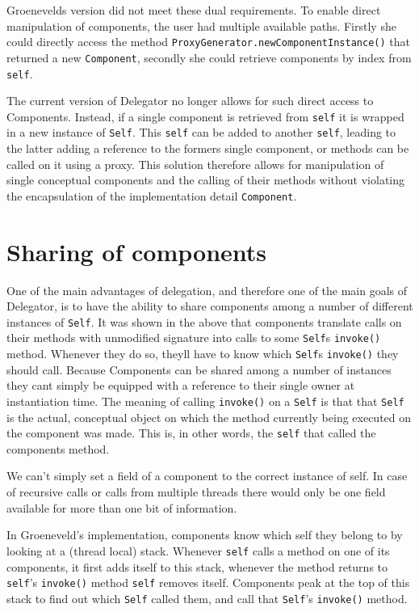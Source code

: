 \documentclass[a4paper,12pt]{book}
\begin{document}
Groenevelds version did not meet these dual requirements. To enable direct manipulation of components, the user had multiple available paths. Firstly she could directly access the method \verb|ProxyGenerator.newComponentInstance()| that returned a new \verb|Component|, secondly she could retrieve components by index from \verb|self|.

The current version of Delegator no longer allows for such direct access to Components. Instead, if a single component is retrieved from \verb|self| it is wrapped in a new instance of \verb|Self|. This \verb|self| can be added to another \verb|self|, leading to the latter adding a reference to the formers single component, or methods can be called on it using a proxy. This solution therefore allows for manipulation of single conceptual components and the calling of their methods without violating the encapsulation of the implementation detail \verb|Component|.

\section*{Sharing of components}
One of the main advantages of delegation, and therefore one of the main goals of Delegator, is to have the ability to share components among a number of different instances of \verb|Self|. It was shown in the above that components translate calls on their methods with unmodified signature into calls to some \verb|Self|s \verb|invoke()| method. Whenever they do so, theyll have to know which \verb|Self|s \verb|invoke()| they should call. Because Components can be shared among a number of instances they cant simply be equipped with a reference to their single owner at instantiation time. The meaning of calling \verb|invoke()| on a \verb|Self| is that that \verb|Self| is the actual, conceptual object on which the method currently being executed on the component was made. This is, in other words, the \verb|self| that called the components method.


We can't simply set a field of a component to the correct instance of self. In case of recursive calls or calls from multiple threads there would only be one field available for more than one bit of information.

In Groeneveld's implementation, components know which self they belong to by looking at a (thread local) stack. Whenever \verb|self| calls a method on one of its components, it first adds itself to this stack, whenever the method returns to \verb|self|'s \verb|invoke()| method \verb|self| removes itself. Components peak at the top of this stack to find out which \verb|Self| called them, and call that \verb|Self|'s \verb|invoke()| method.
\end{document}
